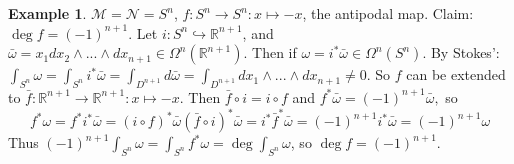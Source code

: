 \documentclass[10pt]{article}
\theoremstyle{plain}
\theoremstyle{definition}
\newtheorem{exmp}[thm]{Example} %
\newcommand{\Real}{\mathbb{R}}
\newcommand{\man}{\mathcal{M}}
\newcommand{\nan}{\mathcal{N}}
\newcommand{\allthewedge}[3]{{#1}_{#2}\wedge...\wedge{#1}_{#3}}
\newcommand{\dx}{dx}
\newcommand{\deriv}{d}
\begin{document}
\begin{exmp}
$\man = \nan = S^n$, $f:S^n \to S^n : x \mapsto -x$, the antipodal map. Claim: $\deg f = (-1)^{n+1}$. Let $i: S^n \hookrightarrow \Real^{n+1}$, and $\bar{\omega} = x_1 \allthewedge{\dx}{2}{n+1} \in \Omega^n(\Real^{n+1}).$ Then if $\omega = i^* \bar{\omega} \in \Omega^n(S^n). $ By Stokes': $\int_{S^n} \omega = \int_{S^n} i^* \bar{\omega} = \int_{D^{n+1}} \deriv\bar\omega = \int_{D^{n+1}} \allthewedge{\dx}{1}{n+1} \neq 0$. So $f$ can be extended to $\bar f : \Real^{n+1} \to \Real^{n+1} : x \mapsto -x$. Then $\bar f \circ i = i\circ f$ and $f^*\bar\omega = (-1)^{n+1} \bar \omega,$ so $$f^*\omega = f^* i^* \bar \omega = (i\circ f)^* \bar \omega (\bar f \circ i) ^* \bar \omega = i^* \bar f ^* \bar \omega = (-1)^{n+1} i^* \bar \omega = (-1)^{n+1} \omega$$ Thus $(-1)^{n+1} \int_{S^n} \omega = \int_{S^n} f^* \omega = \deg \int_{S^n} \omega$, so $\deg f = (-1)^{n+1}.$
\end{exmp}
\end{document}
